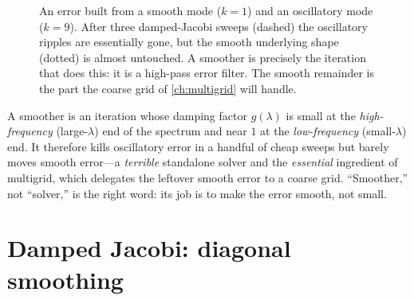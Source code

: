 \begin{figure}[t]
\centering
{}
\caption[Smoothing removes the oscillatory error]{An error built from a smooth
mode ($k=1$) and an oscillatory mode ($k=9$). After three damped-Jacobi sweeps
(dashed) the oscillatory ripples are essentially gone, but the smooth underlying
shape (dotted) is almost untouched. A smoother is precisely the iteration that
does this: it is a high-pass error filter. The smooth remainder is the part the
coarse grid of \cref{ch:multigrid} will handle.}
\label{fig:smoo-errorfreq}
\end{figure}

\begin{keyidea}
A smoother is an iteration whose damping factor $g(\lambda)$ is small at the
\emph{high-frequency} (large-$\lambda$) end of the spectrum and near $1$ at the
\emph{low-frequency} (small-$\lambda$) end. It therefore kills oscillatory error
in a handful of cheap sweeps but barely moves smooth error---a \emph{terrible}
standalone solver and the \emph{essential} ingredient of multigrid, which delegates
the leftover smooth error to a coarse grid. ``Smoother,'' not ``solver,'' is the
right word: its job is to make the error smooth, not small.
\end{keyidea}

\section{Damped Jacobi: diagonal smoothing}
\label{sec:smoo-jacobi}

